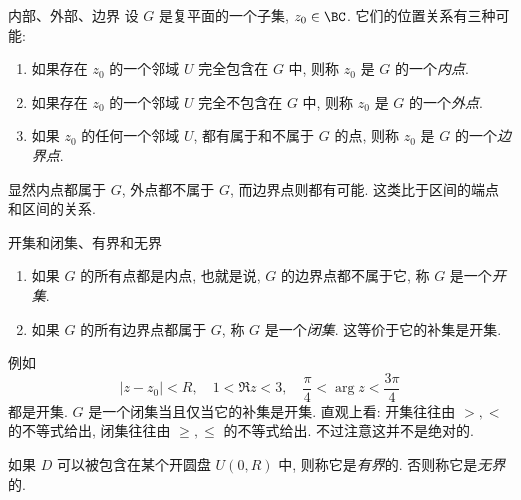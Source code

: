 \begin{frame}{内部、外部、边界}
	\onslide<+->
	设 $G$ 是复平面的一个子集, $z_0\in\BC$.
	\onslide<+->
	它们的位置关系有三种可能:
	\begin{enumerate}
		\item 如果存在 $z_0$ 的一个邻域 $U$ 完全包含在 $G$ 中, 则称 $z_0$ 是 $G$ 的一个\emph{内点}.
		\item 如果存在 $z_0$ 的一个邻域 $U$ 完全不包含在 $G$ 中, 则称 $z_0$ 是 $G$ 的一个\emph{外点}.
		\item 如果 $z_0$ 的任何一个邻域 $U$, 都有属于和不属于 $G$ 的点, 则称 $z_0$ 是 $G$ 的一个\emph{边界点}.
	\end{enumerate}
	\onslide<+->
	显然内点都属于 $G$, 外点都不属于 $G$, 而边界点则都有可能.
	\onslide<+->
	这类比于区间的端点和区间的关系.

	\begin{center}
	\end{center}
\end{frame}


\begin{frame}{开集和闭集、有界和无界}
	\onslide<+->
	\begin{definition}
		\begin{enumerate}
			\item 如果 $G$ 的所有点都是内点, 也就是说, $G$ 的边界点都不属于它, 称 $G$ 是一个\emph{开集}.
			\item 如果 $G$ 的所有边界点都属于 $G$, 称 $G$ 是一个\emph{闭集}. 这等价于它的补集是开集.
		\end{enumerate}
	\end{definition}
	\onslide<+->
	例如
	\[|z-z_0|<R,\quad 1<\Re z<3,\quad\frac\pi4<\arg z<\dfrac{3\pi}4
	\]
	都是开集.
	\onslide<+->
	$G$ 是一个闭集当且仅当它的补集是开集.
	\onslide<+->
	直观上看: 开集往往由 $>,<$ 的不等式给出, 闭集往往由 $\ge,\le$ 的不等式给出.
	\onslide<+->
	不过注意这并不是绝对的.

	\onslide<+->
	如果 $D$ 可以被包含在某个开圆盘 $U(0,R)$ 中, 则称它是\emph{有界}的.
	\onslide<+->
	否则称它是\emph{无界}的.
\end{frame}


